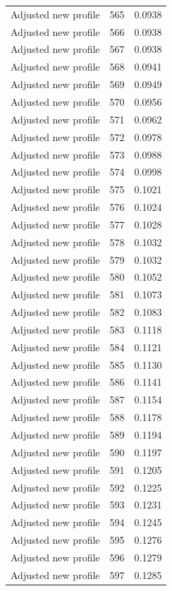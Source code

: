 \begin{table}[htbp]
\begin{tabular}{lll}
Adjusted new profile & 565 & 0.0938 \\
Adjusted new profile & 566 & 0.0938 \\
Adjusted new profile & 567 & 0.0938 \\
Adjusted new profile & 568 & 0.0941 \\
Adjusted new profile & 569 & 0.0949 \\
Adjusted new profile & 570 & 0.0956 \\
Adjusted new profile & 571 & 0.0962 \\
Adjusted new profile & 572 & 0.0978 \\
Adjusted new profile & 573 & 0.0988 \\
Adjusted new profile & 574 & 0.0998 \\
Adjusted new profile & 575 & 0.1021 \\
Adjusted new profile & 576 & 0.1024 \\
Adjusted new profile & 577 & 0.1028 \\
Adjusted new profile & 578 & 0.1032 \\
Adjusted new profile & 579 & 0.1032 \\
Adjusted new profile & 580 & 0.1052 \\
Adjusted new profile & 581 & 0.1073 \\
Adjusted new profile & 582 & 0.1083 \\
Adjusted new profile & 583 & 0.1118 \\
Adjusted new profile & 584 & 0.1121 \\
Adjusted new profile & 585 & 0.1130 \\
Adjusted new profile & 586 & 0.1141 \\
Adjusted new profile & 587 & 0.1154 \\
Adjusted new profile & 588 & 0.1178 \\
Adjusted new profile & 589 & 0.1194 \\
Adjusted new profile & 590 & 0.1197 \\
Adjusted new profile & 591 & 0.1205 \\
Adjusted new profile & 592 & 0.1225 \\
Adjusted new profile & 593 & 0.1231 \\
Adjusted new profile & 594 & 0.1245 \\
Adjusted new profile & 595 & 0.1276 \\
Adjusted new profile & 596 & 0.1279 \\
Adjusted new profile & 597 & 0.1285 \\

\end{tabular}
\end{table}
